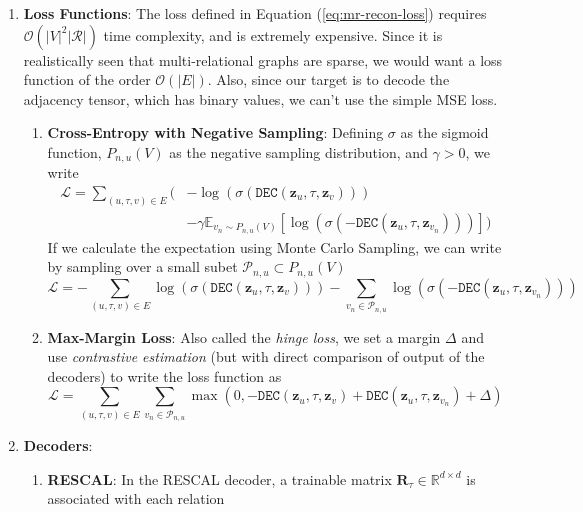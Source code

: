 \begin{enumerate}
\item \textbf{Loss Functions}: The loss defined in Equation (\ref{eq:mr-recon-loss}) requires $\mathcal{O}(|V|^2|\mathcal{R}|)$ time complexity, and is extremely expensive. Since it is realistically seen that multi-relational graphs are sparse, we would want a loss function of the order $\mathcal{O}(|E|)$. Also, since our target is to decode the adjacency tensor, which has binary values, we can't use the simple MSE loss.
\begin{enumerate}
	\item \textbf{Cross-Entropy with Negative Sampling}: Defining $\sigma$ as the sigmoid function, $P_{n,u}(V)$ as the negative sampling distribution, and $\gamma > 0$, we write
	\begin{equation}
	\begin{split}
	\mathcal{L} = \sum_{(u, \tau, v) \in E}\bigg(& -\log(\sigma(\texttt{DEC}(\mathbf{z}_u, \tau, \mathbf{z}_v))) \\&- \gamma \mathbb{E}_{v_n \sim P_{n, u}(V)}[\log(\sigma(-\texttt{DEC}(\mathbf{z}_u, \tau, \mathbf{z}_{v_n})))] \bigg)
	\end{split}
	\end{equation}
If we calculate the expectation using Monte Carlo Sampling, we can write by sampling over a small subet $\mathcal{P}_{n,u} \subset P_{n,u}(V)$
\begin{equation}
\mathcal{L} = -\sum_{(u, \tau, v) \in E}\log(\sigma(\texttt{DEC}(\mathbf{z}_u, \tau, \mathbf{z}_v)))	- \sum_{v_n \in \mathcal{P}_{n, u}}\log(\sigma(-\texttt{DEC}(\mathbf{z}_u, \tau, \mathbf{z}_{v_n})))
\end{equation}
	\item \textbf{Max-Margin Loss}: Also called the \textit{hinge loss}, we set a margin $\Delta$ and use \textit{contrastive estimation} (but with direct comparison of output of the decoders) to write the loss function as
	\begin{equation}
		\mathcal{L} = \sum_{(u, \tau, v) \in E} \sum_{v_n \in \mathcal{P}_{n, u}} \max(0, -\texttt{DEC}(\mathbf{z}_u, \tau, \mathbf{z}_v) + \texttt{DEC}(\mathbf{z}_u, \tau, \mathbf{z}_{v_n}) + \Delta)
	\end{equation}
\end{enumerate}
\item \textbf{Decoders}:
\begin{enumerate}
	\item \textbf{RESCAL}: In the RESCAL decoder, a trainable matrix $\mathbf{R}_\tau \in \mathbb{R}^{d \times d}$ is associated with each relation

\end{enumerate}
\end{enumerate}
